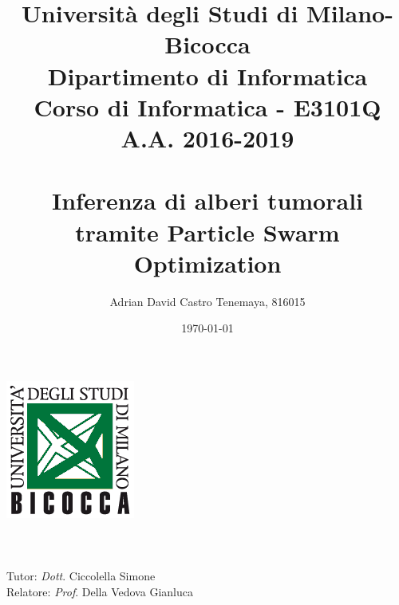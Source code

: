 \documentclass[12pt]{report}
\author{Adrian David Castro Tenemaya, 816015}
\title{Università degli Studi di Milano-Bicocca \\{\small Dipartimento di Informatica \\ Corso di Informatica - E3101Q\\A.A. 2016-2019\\\vspace*{0.55in} \ }\\ Inferenza di alberi tumorali tramite Particle Swarm Optimization \vspace*{1.25in}}
\date{\today}
\begin{document}


\makeatletter
    \begin{titlepage}
        \begin{center}
            \includegraphics{disco.png}\\[4ex]
            {\huge \@title} \\
            {\@author} \\
            {\@date} \\
            Tutor: \textit{Dott}. Ciccolella Simone \\
            Relatore: \textit{Prof}. Della Vedova Gianluca
        \end{center}
    \end{titlepage}
\makeatother



\newpage
\tableofcontents
\listoffigures
\listoftables
{}






\printbibliography

\end{document}
